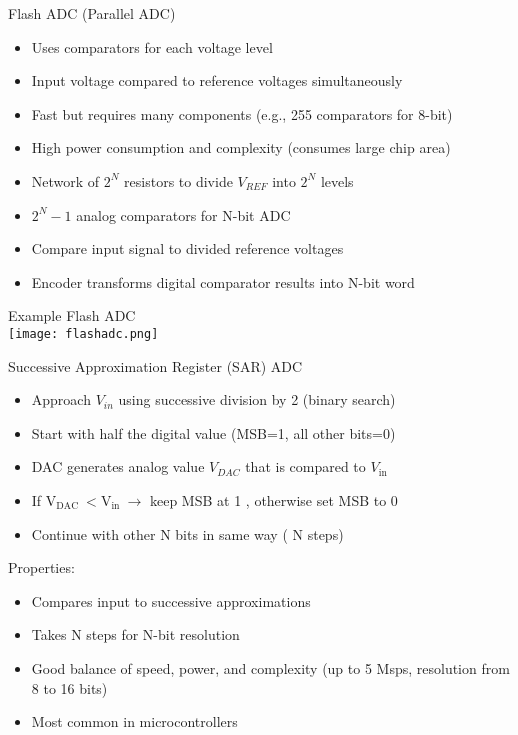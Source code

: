 \begin{concept}{Flash ADC (Parallel ADC)}
\begin{itemize}
    \item Uses comparators for each voltage level
    \item Input voltage compared to reference voltages simultaneously
    \item Fast but requires many components (e.g., 255 comparators for 8-bit)
    \item High power consumption and complexity (consumes large chip area)
    \item Network of $2^N$ resistors to divide $V_{REF}$ into $2^N$ levels
    \item $2^N - 1$ analog comparators for N-bit ADC 
    \item Compare input signal to divided reference voltages
    \item Encoder transforms digital comparator results into N-bit word
\end{itemize}
\end{concept}

\begin{theorem}{Example Flash ADC}\\
    \texttt{[image: flashadc.png]}
\end{theorem}

\begin{concept}{Successive Approximation Register (SAR) ADC}
\begin{itemize}
    \item Approach $V_{in}$ using successive division by 2 (binary search)
    \item Start with half the digital value (MSB=1, all other bits=0)
    \item DAC generates analog value $V_{D A C}$ that is compared to $V_{\text {in }}$
    \item If $\mathrm{V}_{\text {DAC }}<\mathrm{V}_{\text {in }} \rightarrow$ keep MSB at 1 , otherwise set MSB to 0
    \item Continue with other N bits in same way ( N steps)
\end{itemize}
Properties:
\begin{itemize}
    \item Compares input to successive approximations
    \item Takes N steps for N-bit resolution
    \item Good balance of speed, power, and complexity (up to 5 Msps, resolution from 8 to 16 bits)
    \item Most common in microcontrollers
\end{itemize}
\end{concept}

